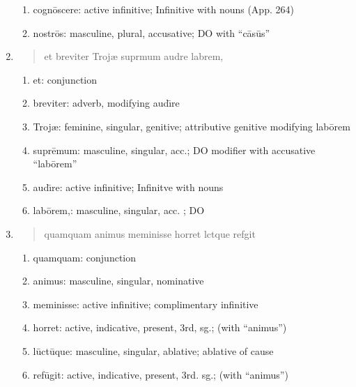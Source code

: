 \documentclass[]{article}
\newcommand{\latify}[1]{
        \Large
        \begin{verse}
          \begin{metrica}
          {#1}\\
          \end{metrica}
        \end{verse}
        \normalsize
}
\begin{document}
\begin{enumerate}
\begin{enumerate}
	\item cogn\={o}scere:  active infinitive; Infinitive with nouns (App. 264)

	\item nostr\={o}s:  masculine, plural, accusative; DO with ``c\={a}s\={u}s''
\end{enumerate}


\item \latify{et breviter Troj{\ae} supr{}mum aud{\macron {\i}}re lab{\macron {o}}rem,}
\begin{enumerate}

	\item et:  conjunction

	\item breviter:  adverb, modifying aud\={\i}re

	\item Troj{\ae}:   feminine, singular, genitive; attributive genitive modifying lab\={o}rem

	\item supr\={e}mum: masculine, singular, acc.; DO modifier with accusative ``lab\={o}rem''

	\item aud\={\i}re:   active infinitive; Infinitve with nouns

	\item lab\={o}rem,:   masculine, singular, acc. ; DO 

\end{enumerate}


\item \latify{quamquam animus meminisse horret l{}ct{\macron {u}}que ref{\macron {u}}git}     
\begin{enumerate}

	\item quamquam:  conjunction

	\item animus:  masculine, singular, nominative

	\item meminisse: active infinitive; complimentary infinitive

	\item horret:  active, indicative, present, 3rd, sg.; (with ``animus'')

	\item l\={u}ct\={u}que: masculine, singular, ablative; ablative of cause

	\item ref\={u}git: active, indicative, present, 3rd. sg.; (with ``animus'')


\end{enumerate}
\end{enumerate}
\end{document}
